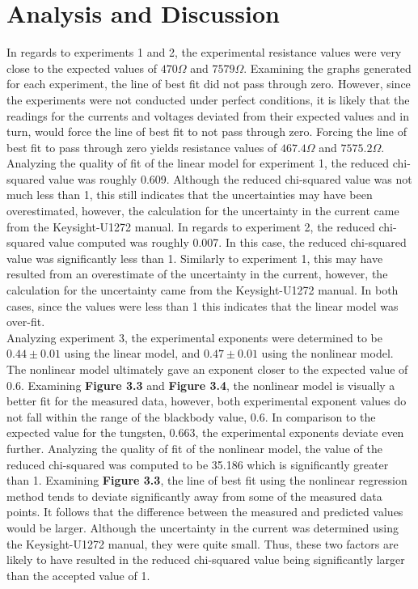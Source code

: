 \documentclass[
	letterpaper, %
	10pt, %
]{CSUniSchoolLabReport}
\begin{document}
\section{Analysis and Discussion} %
In regards to experiments 1 and 2, the experimental resistance values were very close to the expected values of $470 \Omega$ and $7579 \Omega$.
Examining the graphs generated for each experiment, the line of best fit did not pass through zero.
However, since the experiments were not conducted under perfect conditions, it is likely that the readings for the currents and
	voltages deviated from their expected values and in turn, would force the line of best fit to not pass through zero.
Forcing the line of best fit to pass through zero yields resistance values of $467.4 \Omega$ and $7575.2 \Omega$. Analyzing the quality
	of fit of the linear model for experiment 1, the reduced chi-squared value was roughly 0.609. Although the reduced chi-squared
	value was not much less than 1, this still indicates that the uncertainties may have been overestimated, however,
	the calculation for the uncertainty in the current came from the Keysight-U1272 manual. In regards to experiment 2,
	the reduced chi-squared value computed was roughly 0.007. In this case, the reduced chi-squared value was significantly
	less than 1. Similarly to experiment 1, this may have resulted from an overestimate of the uncertainty in the current, however,
	the calculation for the uncertainty came from the Keysight-U1272 manual. In both cases, since the values were less than 1 this indicates that the linear model was over-fit.\\

Analyzing experiment 3, the experimental exponents were determined to be $0.44 \pm 0.01$ using the linear model, and $0.47 \pm 0.01$
	using the nonlinear model. The nonlinear model ultimately gave an exponent closer to the expected value of 0.6.
Examining \textbf{Figure 3.3} and \textbf{Figure 3.4}, the nonlinear model is visually a better fit for the measured data, however, both experimental
	exponent values do not fall within the range of the blackbody value, $0.6$. In comparison to the expected value for the tungsten,
	0.663, the experimental exponents deviate even further. Analyzing the quality of fit of the nonlinear model, the value of the
	reduced chi-squared was computed to be 35.186 which is significantly greater than 1. Examining \textbf{Figure 3.3}, the line of best fit using
	the nonlinear regression method tends to deviate significantly away from some of the measured data points. It follows that the difference
	between the measured and predicted values would be larger. Although the uncertainty in the current was determined using the Keysight-U1272 manual,
	they were quite small. Thus, these two factors are likely to have resulted in the reduced chi-squared value being significantly larger than the accepted value of 1.\\
\end{document}
